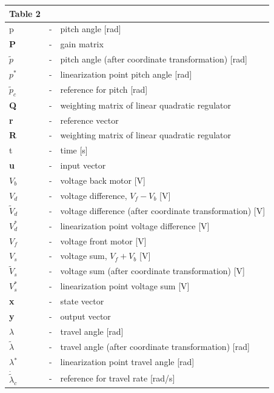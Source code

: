 \begin{center}
\begin{tabular}{ l  c  l }{Table 2}\\
  \hline			
    p &- &pitch angle [rad]\\
    \textbf{P}& -& gain matrix\\
    $\tilde{p}$&- &pitch angle (after coordinate transformation) [rad]\\
    $p{}^*$ &-& linearization point pitch angle [rad]\\
    $\tilde{p}_c$ &-& reference for pitch [rad]\\
    \textbf{Q}& -& weighting matrix of linear quadratic regulator\\
    \textbf{r} & - & reference vector\\
    \textbf{R}& -& weighting matrix of linear quadratic regulator\\
    t &- &time [s]\\
    \textbf{u}& - &input vector\\
    $V_b$ &- &voltage back motor [V]\\
    $V_d$ &- &voltage difference, $V_f - V_b$ [V]\\
    $\tilde{V}_d$ &- &voltage difference (after coordinate transformation) [V]\\
    $V_{d}^*$& - &linearization point voltage difference [V]\\
    $V_f$ &- &voltage front motor [V]\\
    $V_s$ &- &voltage sum, $V_f + V_b$ [V]\\
    $\tilde{V}_s$&-& voltage sum (after coordinate transformation) [V]\\
    $V_{s}^*$ &- &linearization point voltage sum [V]\\
    \textbf{x} &- &state vector\\
    \textbf{y}& - &output vector\\
    $\lambda$ &- &travel angle [rad]\\
    $\tilde{\lambda}$ &- &travel angle (after coordinate transformation) [rad]\\
    $\lambda{}^*$ &- &linearization point travel angle [rad]\\
    $\dot{\tilde{\lambda}}_c$& - &reference for travel rate [rad/s]\\
  \hline  
\end{tabular}
\end{center}
